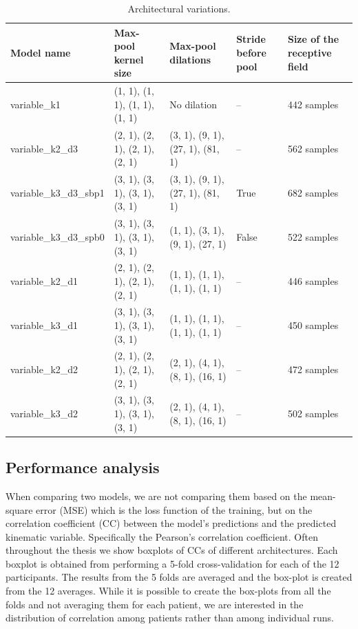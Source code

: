 \begin{table}
\centering
\begin{tabular}{lllll}
\toprule
Model name & Max-pool kernel size & Max-pool dilations & Stride before pool & Size of the receptive field \\
\midrule
variable\_k1 & (1, 1), (1, 1), (1, 1), (1, 1) & No dilation & -- & 442 samples \\
\hline
variable\_k2\_d3 &(2, 1), (2, 1), (2, 1), (2, 1) & (3, 1), (9, 1), (27, 1), (81, 1) & -- & 562 samples \\
\hline
variable\_k3\_d3\_sbp1 & (3, 1), (3, 1), (3, 1), (3, 1) & (3, 1), (9, 1), (27, 1), (81, 1) & True & 682 samples \\
\hline
variable\_k3\_d3\_spb0 & (3, 1), (3, 1), (3, 1), (3, 1) & (1, 1), (3, 1), (9, 1), (27, 1) & False & 522 samples \\
\hline
variable\_k2\_d1 & (2, 1), (2, 1), (2, 1), (2, 1) & (1, 1), (1, 1), (1, 1), (1, 1) & -- & 446 samples \\
\hline
variable\_k3\_d1 &(3, 1), (3, 1), (3, 1), (3, 1) & (1, 1), (1, 1), (1, 1), (1, 1) & -- & 450 samples \\
\hline
variable\_k2\_d2 & (2, 1), (2, 1), (2, 1), (2, 1) & (2, 1), (4, 1), (8, 1), (16, 1) & -- & 472 samples \\
\hline
variable\_k3\_d2 &(3, 1), (3, 1), (3, 1), (3, 1)& (2, 1), (4, 1), (8, 1), (16, 1) & -- & 502 samples \\
\hline
\bottomrule
\end{tabular}
\caption{Architectural variations.}
\end{table}\label{tab:architectures-description}

\subsection{Performance analysis}\label{subsec:performance-analysis}
When comparing two models, we are not comparing them based on the mean-square error (MSE) which is the loss function of the training, but on the correlation coefficient (CC) between the model's predictions and the predicted kinematic variable.
Specifically the Pearson's correlation coefficient.
Often throughout the thesis we show boxplots of CCs of different architectures.
Each boxplot is obtained from performing a 5-fold cross-validation for each of the 12 participants.
The results from the 5 folds are averaged and the box-plot is created from the 12 averages.
While it is possible to create the box-plots from all the folds and not averaging them for each patient, we are interested in the distribution of correlation among patients rather than among individual runs.